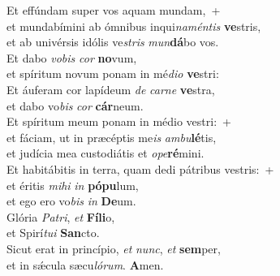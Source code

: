 \evenverse Et effúndam super vos aquam mundam,~+\\\evenverse  et mundabímini ab ómnibus inqui\textit{na}\textit{mén}\textit{tis} \textbf{ve}stris,~\*\\
\evenverse et ab univérsis idólis ve\textit{stris} \textit{mun}\textbf{dá}bo vos.\\
\oddverse Et dabo \textit{vo}\textit{bis} \textit{cor} \textbf{no}vum,~\*\\
\oddverse et spíritum novum ponam in mé\textit{di}\textit{o} \textbf{ve}stri:\\
\evenverse Et áuferam cor lapídeum \textit{de} \textit{car}\textit{ne} \textbf{ve}stra,~\*\\
\evenverse et dabo vo\textit{bis} \textit{cor} \textbf{cár}neum.\\
\oddverse Et spíritum meum ponam in médio vestri:~+\\
\oddverse  et fáciam, ut in præcéptis me\textit{is} \textit{am}\textit{bu}\textbf{lé}tis,~\*\\
\oddverse et judícia mea custodiátis et \textit{o}\textit{pe}\textbf{ré}mini.\\
\evenverse Et habitábitis in terra, quam dedi pátribus vestris:~+\\
\evenverse  et éritis \textit{mi}\textit{hi} \textit{in} \textbf{pó}\textbf{pu}lum,~\*\\
\evenverse et ego ero vo\textit{bis} \textit{in} \textbf{De}um.\\
\oddverse Glória \textit{Pa}\textit{tri}, \textit{et} \textbf{Fí}\textbf{li}o,~\*\\
\oddverse et Spirí\textit{tu}\textit{i} \textbf{San}cto.\\
\evenverse Sicut erat in princípio, \textit{et} \textit{nunc}, \textit{et} \textbf{sem}per,~\*\\
\evenverse et in sǽcula sæcu\textit{ló}\textit{rum}. \textbf{A}men.\\
